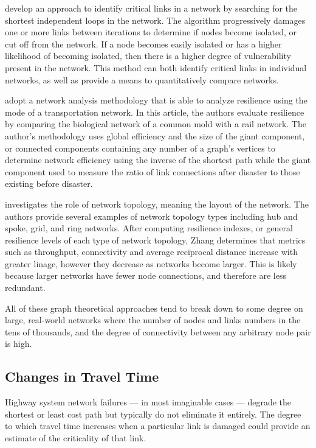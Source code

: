 \cite{vodak2019} develop an approach to identify
critical links in a network by searching for the shortest independent
loops in the network. The algorithm progressively damages one or more links
between iterations to determine if nodes become isolated, or cut off from
the
network. If a node becomes easily isolated or has a higher likelihood of
becoming isolated, then there is a higher degree of vulnerability present
in the
network. This method can both identify critical links in individual
networks, as
well as provide a means to quantitatively compare networks.

\cite{osei2014} adopt a network analysis methodology that is able to
analyze
resilience using the mode of a transportation network. In this
article, the authors evaluate resilience by comparing the biological
network of a common mold
with a rail network. The author’s methodology uses global efficiency and
the size of the giant
component, or connected
components containing any number of a graph's vertices to determine
network efficiency using the
inverse of the shortest path while the giant component used to measure the
ratio of link
connections after disaster to those existing before disaster.

\cite{zhang2015.2} investigates the role of network topology, meaning the
layout of the network.
The authors provide several examples of network topology types including
hub and spoke, grid, and
ring networks. After computing resilience indexes, or general resilience
levels of each type of
network topology, Zhang determines that metrics such as throughput,
connectivity and average
reciprocal distance increase with greater linage, however they decrease as
networks become
larger. This is likely because larger networks have fewer node
connections, and
therefore are less redundant.

All of these graph theoretical approaches tend to break down to some
degree on
large, real-world networks where the number of nodes and links numbers in
the tens
of thousands, and the degree of connectivity between any arbitrary node
pair is
high.

\subsection{Changes in Travel Time}

Highway system network failures --- in most imaginable cases --- degrade
the
shortest or least cost path but typically do not eliminate it entirely.
The degree
to which travel time increases when a particular link is damaged could
provide an
estimate of the criticality of that link.

